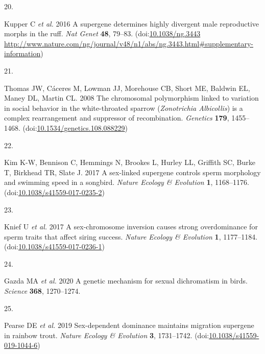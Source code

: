 \documentclass[
  11pt,
  a4paper,
]{article}
\newlength{\cslhangindent}
\newlength{\csllabelwidth}
\newlength{\cslentryspacingunit} %
\newenvironment{CSLReferences}[2] %
 {%
  \setlength{\parindent}{0pt}
  \ifodd #1
  \let\oldpar\par
  \def\par{\hangindent=\cslhangindent\oldpar}
  \fi
  \setlength{\parskip}{#2\cslentryspacingunit}
 }%
 {}
\newcommand{\CSLLeftMargin}[1]{\parbox[t]{\csllabelwidth}{#1}}
\newcommand{\CSLRightInline}[1]{\parbox[t]{\linewidth - \csllabelwidth}{#1}\break}
\begin{document}
\begin{CSLReferences}{0}{0}
\leavevmode{}%
\CSLLeftMargin{20. }%
\CSLRightInline{Kupper C \emph{et al.} 2016 A supergene determines highly divergent male reproductive morphs in the ruff. \emph{Nat Genet} \textbf{48}, 79--83. (doi:\href{10.1038/ng.3443\%20http://www.nature.com/ng/journal/v48/n1/abs/ng.3443.html\#supplementary-information}{10.1038/ng.3443 http://www.nature.com/ng/journal/v48/n1/abs/ng.3443.html\#supplementary-information})}

\leavevmode{}%
\CSLLeftMargin{21. }%
\CSLRightInline{Thomas JW, Cáceres M, Lowman JJ, Morehouse CB, Short ME, Baldwin EL, Maney DL, Martin CL. 2008 The chromosomal polymorphism linked to variation in social behavior in the white-throated sparrow ({\emph{Zonotrichia Albicollis}}) is a complex rearrangement and suppressor of recombination. \emph{Genetics} \textbf{179}, 1455--1468. (doi:\href{https://doi.org/10.1534/genetics.108.088229}{10.1534/genetics.108.088229})}

\leavevmode{}%
\CSLLeftMargin{22. }%
\CSLRightInline{Kim K-W, Bennison C, Hemmings N, Brookes L, Hurley LL, Griffith SC, Burke T, Birkhead TR, Slate J. 2017 A sex-linked supergene controls sperm morphology and swimming speed in a songbird. \emph{Nature Ecology \& Evolution} \textbf{1}, 1168--1176. (doi:\href{https://doi.org/10.1038/s41559-017-0235-2}{10.1038/s41559-017-0235-2})}

\leavevmode{}%
\CSLLeftMargin{23. }%
\CSLRightInline{Knief U \emph{et al.} 2017 A sex-chromosome inversion causes strong overdominance for sperm traits that affect siring success. \emph{Nature Ecology \& Evolution} \textbf{1}, 1177--1184. (doi:\href{https://doi.org/10.1038/s41559-017-0236-1}{10.1038/s41559-017-0236-1})}

\leavevmode{}%
\CSLLeftMargin{24. }%
\CSLRightInline{Gazda MA \emph{et al.} 2020 A genetic mechanism for sexual dichromatism in birds. \emph{Science} \textbf{368}, 1270--1274.}

\leavevmode{}%
\CSLLeftMargin{25. }%
\CSLRightInline{Pearse DE \emph{et al.} 2019 Sex-dependent dominance maintains migration supergene in rainbow trout. \emph{Nature Ecology \& Evolution} \textbf{3}, 1731--1742. (doi:\href{https://doi.org/10.1038/s41559-019-1044-6}{10.1038/s41559-019-1044-6})}


\end{CSLReferences}
\end{document}

